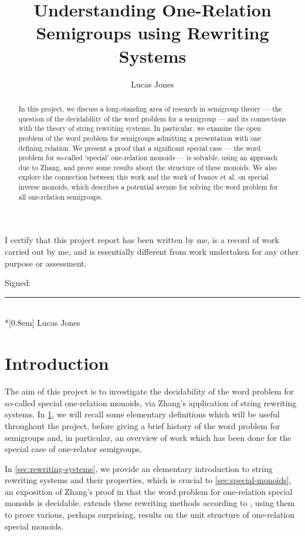 \documentclass[noindex,noinsetproof,emphthm,12pt]{lmaths}
\title{Understanding One-Relation Semigroups using Rewriting Systems}
\author{Lucas Jones}
\newcommand{\frontmatter}{\pagenumbering{roman}}
\newcommand{\mainmatter}{\pagenumbering{arabic}}
\begin{document}
\vfill
\maketitle
\vfill
\thispagestyle{empty}
\clearpage

\frontmatter

\clearpage
I certify that this project report has been written by me, is a record of work carried out by me, and is essentially different from work undertaken for any other purpose or assessment.

\vspace{1.5em}
Signed: \rule[-2pt]{15em}{1pt} \\*[0.8em]
\hphantom{Signed: }Lucas Jones
\clearpage


\begin{abstract}
	In this project, we discuss a long-standing area of research in semigroup theory --- the question of the decidability of the word problem for a semigroup --- and its connections with the theory of string rewriting systems. In particular, we examine the open problem of the word problem for semigroups admitting a presentation with one defining relation. We present a proof that a significant special case --- the word problem for so-called `special' one-relation monoids --- is solvable, using an approach due to Zhang, and prove some results about the structure of these monoids. We also explore the connection between this work and the work of Ivanov et al. on special inverse monoids, which describes a potential avenue for solving the word problem for all one-relation semigroups.
\end{abstract}
\clearpage

\tableofcontents

\clearpage

\mainmatter
\section{Introduction} \label{sec:intro}

The aim of this project is to investigate the decidability of the word problem for so-called special one-relation monoids, via Zhang's application of string rewriting systems. In \cref{sec:intro}, we will recall some elementary definitions which will be useful throughout the project, before giving a brief history of the word problem for semigroups and, in particular, an overview of work which has been done for the special case of one-relator semigroups.

In \cref{sec:rewriting-systems}, we provide an elementary introduction to string rewriting systems and their properties, which is crucial to \cref{sec:special-monoids}, an exposition of Zhang's proof in \cite{Zhang1992a} that the word problem for one-relation special monoids is decidable.  extends these rewriting methods according to \cite{Zhang1992}, using them to prove various, perhaps surprising, results on the unit structure of one-relation special monoids.
\end{document}
